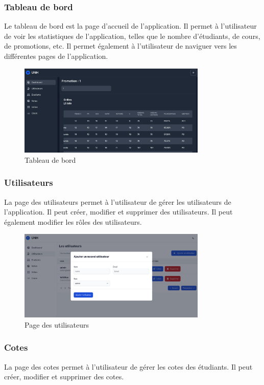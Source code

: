 \subsubsection*{Tableau de bord}\label{subsec:tableau-de-bord}
Le tableau de bord est la page d'accueil de l'application. Il permet à l'utilisateur de voir les statistiques de l'application, telles que le nombre d'étudiants, de cours, de promotions, etc. Il permet également à l'utilisateur de naviguer vers les différentes pages de l'application.

\begin{figure}[ht]
  \centering
  \includegraphics[width=0.8\textwidth]{gfx/ui/grid}
  \caption{Tableau de bord}
  \label{fig:dashboard}
\end{figure}

\subsubsection*{Utilisateurs}\label{subsec:utilisateurs}
La page des utilisateurs permet à l'utilisateur de gérer les utilisateurs de l'application. Il peut créer, modifier et supprimer des utilisateurs. Il peut également modifier les rôles des utilisateurs.

\begin{figure}[ht]
  \centering
  \includegraphics[width=0.8\textwidth]{gfx/ui/users}
  \caption{Page des utilisateurs}
  \label{fig:users}
\end{figure}

\subsubsection*{Cotes}\label{subsec:cotes}
La page des cotes permet à l'utilisateur de gérer les cotes des étudiants. Il peut créer, modifier et supprimer des cotes.

